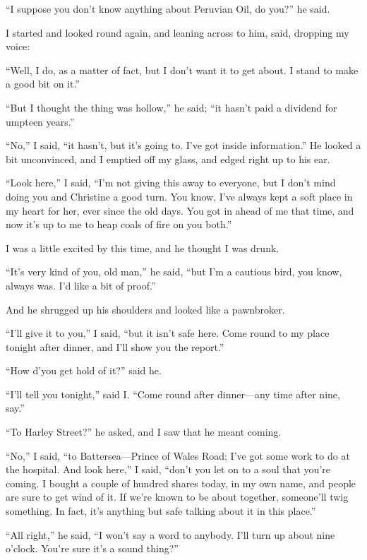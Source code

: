 \enquote{I suppose you don’t know anything about Peruvian Oil, do you?} he said.

I started and looked round again, and leaning across to him, said, dropping my voice:

\enquote{Well, I do, as a matter of fact, but I don’t want it to get about. I stand to make a good bit on it.}

\enquote{But I thought the thing was hollow,} he said; \enquote{it hasn’t paid a dividend for umpteen years.}

\enquote{No,} I said, \enquote{it hasn’t, but it’s going to. I’ve got inside information.} He looked a bit unconvinced, and I emptied off my glass, and edged right up to his ear.

\enquote{Look here,} I said, \enquote{I’m not giving this away to everyone, but I don’t mind doing you and Christine a good turn. You know, I’ve always kept a soft place in my heart for her, ever since the old days. You got in ahead of me that time, and now it’s up to me to heap coals of fire on you both.}

I was a little excited by this time, and he thought I was drunk.

\enquote{It’s very kind of you, old man,} he said, \enquote{but I’m a cautious bird, you know, always was. I’d like a bit of proof.}

And he shrugged up his shoulders and looked like a pawnbroker.

\enquote{I’ll give it to you,} I said, \enquote{but it isn’t safe here. Come round to my place tonight after dinner, and I’ll show you the report.}

\enquote{How d’you get hold of it?} said he.

\enquote{I’ll tell you tonight,} said I. \enquote{Come round after dinner\allowbreak---\allowbreak any time after nine, say.}

\enquote{To Harley Street?} he asked, and I saw that he meant coming.

\enquote{No,} I said, \enquote{to Battersea\allowbreak---\allowbreak Prince of Wales Road; I’ve got some work to do at the hospital. And look here,} I said, \enquote{don’t you let on to a soul that you’re coming. I bought a couple of hundred shares today, in my own name, and people are sure to get wind of it. If we’re known to be about together, someone’ll twig something. In fact, it’s anything but safe talking about it in this place.}

\enquote{All right,} he said, \enquote{I won’t say a word to anybody. I’ll turn up about nine o’clock. You’re sure it’s a sound thing?}

